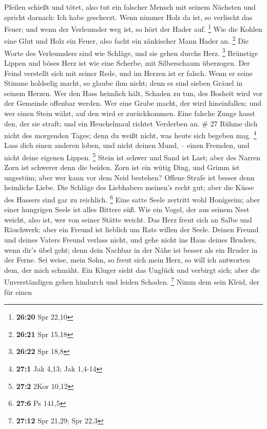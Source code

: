 Pfeilen schießt und tötet,  also tut ein falscher Mensch
mit seinem Nächsten und spricht darnach: Ich habe gescherzt.
 Wenn nimmer Holz da ist, so verlischt das Feuer; und wenn
der Verleumder weg ist, so hört der Hader auf. \footnote{\textbf{26:20}
  Spr 22,10}  Wie die Kohlen eine Glut und Holz ein Feuer,
also facht ein zänkischer Mann Hader an. \footnote{\textbf{26:21} Spr
  15,18}  Die Worte des Verleumders sind wie Schläge, und
sie gehen durchs Herz. \footnote{\textbf{26:22} Spr 18,8} 
Brünstige Lippen und böses Herz ist wie eine Scherbe, mit Silberschaum
überzogen.  Der Feind verstellt sich mit seiner Rede, und
im Herzen ist er falsch.  Wenn er seine Stimme holdselig
macht, so glaube ihm nicht; denn es sind sieben Gräuel in seinem Herzen.
 Wer den Hass heimlich hält, Schaden zu tun, des Bosheit
wird vor der Gemeinde offenbar werden.  Wer eine Grube
macht, der wird hineinfallen; und wer einen Stein wälzt, auf den wird er
zurückkommen.  Eine falsche Zunge hasst den, der sie
straft; und ein Heuchelmaul richtet Verderben an. \# 27 
Rühme dich nicht des morgenden Tages; denn du weißt nicht, was heute
sich begeben mag. \footnote{\textbf{27:1} Jak 4,13; Jak 1,4-14}
 Lass dich einen anderen loben, und nicht deinen Mund, --
einen Fremden, und nicht deine eigenen Lippen. \footnote{\textbf{27:2}
  2Kor 10,12}  Stein ist schwer und Sand ist Last; aber des
Narren Zorn ist schwerer denn die beiden.  Zorn ist ein
wütig Ding, und Grimm ist ungestüm; aber wer kann vor dem Neid bestehen?
 Offene Strafe ist besser denn heimliche Liebe. 
Die Schläge des Liebhabers meinen's recht gut; aber die Küsse des
Hassers sind gar zu reichlich. \footnote{\textbf{27:6} Ps 141,5}
 Eine satte Seele zertritt wohl Honigseim; aber einer
hungrigen Seele ist alles Bittere süß.  Wie ein Vogel, der
aus seinem Nest weicht, also ist, wer von seiner Stätte weicht.
 Das Herz freut sich an Salbe und Räuchwerk; aber ein Freund
ist lieblich um Rats willen der Seele.  Deinen Freund und
deines Vaters Freund verlass nicht, und gehe nicht ins Haus deines
Bruders, wenn dir's übel geht; denn dein Nachbar in der Nähe ist besser
als ein Bruder in der Ferne.  Sei weise, mein Sohn, so
freut sich mein Herz, so will ich antworten dem, der mich schmäht.
 Ein Kluger sieht das Unglück und verbirgt sich; aber die
Unverständigen gehen hindurch und leiden Schaden. \footnote{\textbf{27:12}
  Spr 21,29; Spr 22,3}  Nimm dem sein Kleid, der für einen
